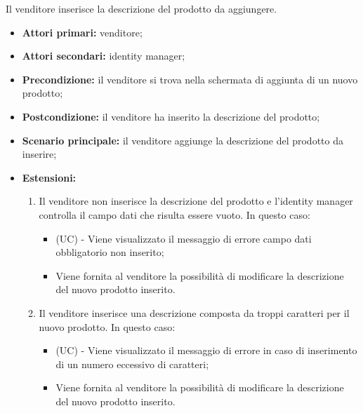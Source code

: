Il venditore inserisce la descrizione del prodotto da aggiungere.
\begin{itemize}
    \item \textbf{Attori primari:} venditore;
    \item \textbf{Attori secondari:} identity manager;
    \item \textbf{Precondizione:} il venditore si trova nella schermata di aggiunta di un nuovo prodotto;
    \item \textbf{Postcondizione:} il venditore ha inserito la descrizione del prodotto;
    \item \textbf{Scenario principale:} il venditore aggiunge la descrizione del prodotto da inserire;
    \item \textbf{Estensioni:}
    \begin{enumerate}[label=\lett]
    	\item Il venditore non inserisce la descrizione del prodotto e l'identity manager controlla il campo dati che risulta essere vuoto. In questo caso:
    	\begin{itemize}
    		\item (UC) - Viene visualizzato il messaggio di errore campo dati obbligatorio non inserito;
    		\item Viene fornita al venditore la possibilità di modificare la descrizione del nuovo prodotto inserito.
    	\end{itemize}
        \item Il venditore inserisce una descrizione composta da troppi caratteri per il nuovo prodotto. In questo caso:
	    \begin{itemize}
    		\item (UC) - Viene visualizzato il messaggio di errore in caso di inserimento di un numero eccessivo di caratteri;
	    	\item Viene fornita al venditore la possibilità di modificare la descrizione del nuovo prodotto inserito.
	    \end{itemize}
    \end{enumerate}
\end{itemize}

